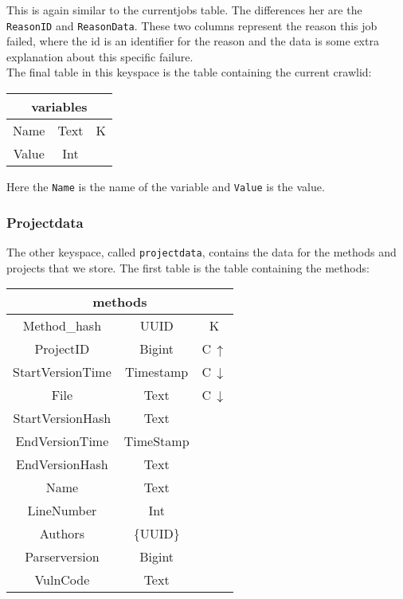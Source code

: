 \documentclass[../Main.tex]{subfiles}
\begin{document}
This is again similar to the currentjobs table. The differences her are the \texttt{ReasonID} and \texttt{ReasonData}. These two columns represent the reason this job failed, where the id is an identifier for the reason and the data is some extra explanation about this specific failure.\\

The final table in this keyspace is the table containing the current crawlid:
\begin{table}[h]
    \centering
    \begin{tabular}{|ccc|}
\hline
    \multicolumn{3}{|c|}{\textbf{variables}}   \\
    \hline
    Name & Text & K \\
    Value & Int & \\
    \hline
\end{tabular}
\end{table}

Here the \texttt{Name} is the name of the variable and \texttt{Value} is the value.

\subsubsection{Projectdata}
The other keyspace, called \texttt{projectdata}, contains the data for the methods and projects that we store. The first table is the table containing the methods:

\begin{table}[h]
    \centering
    \begin{tabular}{|ccc|}
\hline
    \multicolumn{3}{|c|}{\textbf{methods}}   \\
    \hline
    Method\_hash & UUID & K \\
    ProjectID & Bigint & C\,$\uparrow$\\
    StartVersionTime & Timestamp & C\,$\downarrow$\\
    File & Text & C\,$\downarrow$\\
    StartVersionHash & Text & \\
    EndVersionTime & TimeStamp & \\
    EndVersionHash & Text & \\
    Name & Text & \\
    LineNumber & Int & \\ 
    Authors & \{UUID\} & \\
    Parserversion & Bigint & \\
    VulnCode & Text & \\
    \hline
\end{tabular}
\end{table}
\end{document}
